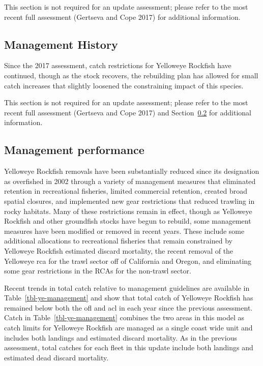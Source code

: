 \documentclass[
]{scrartcl}
\begin{document}
This section is not required for an update assessment; please refer to
the most recent full assessment (Gertseva and Cope 2017) for additional
information.

\subsection{Management History}\label{management-history}

Since the 2017 assessment, catch restrictions for Yelloweye Rockfish
have continued, though as the stock recovers, the rebuilding plan has
allowed for small catch increases that slightly loosened the
constraining impact of this species.

This section is not required for an update assessment; please refer to
the most recent full assessment (Gertseva and Cope 2017) and
Section~\ref{sec-mgmt} for additional information.

\subsection{Management performance}\label{sec-mgmt}

Yelloweye Rockfish removals have been substantially reduced since its
designation as overfished in 2002 through a variety of management
measures that eliminated retention in recreational fisheries, limited
commercial retention, created broad spatial closures, and implemented
new gear restrictions that reduced trawling in rocky habitats. Many of
these restrictions remain in effect, though as Yelloweye Rockfish and
other groundfish stocks have begun to rebuild, some management measures
have been modified or removed in recent years. These include some
additional allocations to recreational fisheries that remain constrained
by Yelloweye Rockfish estimated discard mortality, the recent removal of
the Yelloweye \gls{rca} for the trawl sector off of California and
Oregon, and eliminating some gear restrictions in the RCAs for the
non-trawl sector.

Recent trends in total catch relative to management guidelines are
available in Table~\ref{tbl-ye-management} and show that total catch of
Yelloweye Rockfish has remained below both the \gls{ofl} and \gls{acl}
in each year since the previous assessment. Catch in
Table~\ref{tbl-ye-management} combines the two areas in this model as
catch limits for Yelloweye Rockfish are managed as a single coast wide
unit and includes both landings and estimated discard mortality. As in
the previous assessment, total catches for each fleet in this update
include both landings and estimated dead discard mortality.
\end{document}
